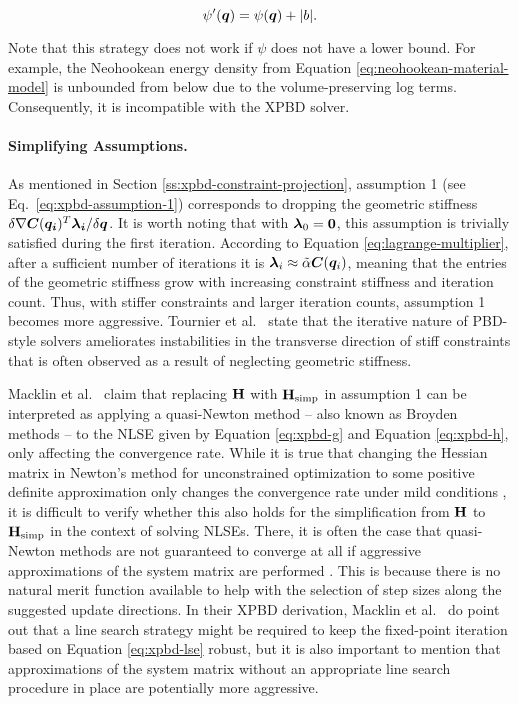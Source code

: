 \begin{equation}\label{eq:xpbd-potential-non-negative}
    \psi^\prime(\bm{q}) = \psi(\bm{q}) + \vert b \vert.
\end{equation}

\noindent Note that this strategy does not work if $\psi$ does not have a lower bound. For example, the Neohookean energy density from 
Equation \ref{eq:neohookean-material-model} is unbounded from below due to the volume-preserving log terms. Consequently, it is incompatible with the XPBD 
solver.

\paragraph{Simplifying Assumptions.}
As mentioned in Section \ref{ss:xpbd-constraint-projection}, assumption 1 (see Eq.\ \ref{eq:xpbd-assumption-1}) corresponds to dropping the geometric stiffness 
$\delta \nabla \bm{C}(\bm{q_i})^T \bm{\lambda_i} / \delta \bm{q}$. It is worth noting that with $\bm{\lambda}_0 = \bm{0}$, this assumption is 
trivially satisfied during the first iteration. According to Equation \ref{eq:lagrange-multiplier}, after a sufficient number of iterations it is $\bm{\lambda}_i 
\approx \tilde{\mathbf{\alpha}} \bm{C}(\bm{q}_i)$, meaning that the entries of the geometric stiffness grow with increasing constraint stiffness and iteration
count. Thus, with stiffer constraints and larger iteration counts, assumption 1 becomes more aggressive. Tournier et al.\ \cite{tournier2015} state that
the iterative nature of PBD-style solvers ameliorates instabilities in the transverse direction of stiff constraints that is often observed as a result
of neglecting geometric stiffness.

Macklin et al.\ \cite{macklin2016} claim that replacing $\mathbf{H}$ with $\mathbf{H}_{\text{simp}}$ in assumption 1 can be interpreted as applying a quasi-Newton 
method -- also known as Broyden methods -- to the NLSE given by Equation \ref{eq:xpbd-g} and Equation \ref{eq:xpbd-h}, only affecting the convergence rate. While it is 
true that changing the Hessian 
matrix in Newton's method for unconstrained optimization to some positive definite approximation only changes the convergence rate under mild conditions
\cite{nocedal2006}, it is difficult to verify whether this also holds for the simplification from $\mathbf{H}$ to $\mathbf{H}_{\text{simp}}$ in the context of
solving NLSEs. There, it is often the case that quasi-Newton methods are not guaranteed to converge at all if aggressive approximations
of the system matrix are performed \cite{nocedal2006}. This is because there is no natural merit function available to help with the selection of 
step sizes along the suggested update directions. In their XPBD derivation, Macklin et al.\ \cite{macklin2016} do
point out that a line search strategy might be required to keep the fixed-point iteration based on Equation \ref{eq:xpbd-lse} robust, but it is also important
to mention that approximations of the system matrix without an appropriate line search procedure in place are potentially more aggressive.

